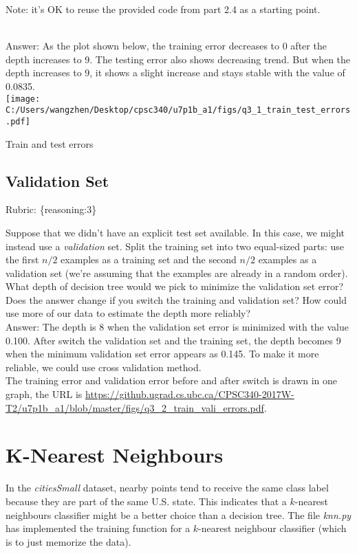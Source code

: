 \documentclass{article}
\def\blu#1{{\color{blu}#1}}
\def\gre#1{{\color{gre}#1}}
\def\rubric#1{\gre{Rubric: \{#1\}}}{}
\begin{document}
Note: it's OK to reuse the provided code from part 2.4 as a starting point.
\textcolor{gre}{
\\Answer:
As the plot shown below, the training error decreases to 0 after the depth increases to 9. The testing error also shows decreasing trend. But when the depth increases to 9, it shows a slight increase and stays stable with the value of 0.0835.\\
\texttt{[image: C:/Users/wangzhen/Desktop/cpsc340/u7p1b\_a1/figs/q3\_1\_train\_test\_errors.pdf]}
\caption{Train and test errors}
}


\subsection{Validation Set}
\rubric{reasoning:3}

Suppose that we didn't have an explicit test set available. In this case, we might instead use a \emph{validation} set. Split the training set into two equal-sized parts: use the first $n/2$ examples as a training set and the second $n/2$ examples as a validation set (we're assuming that the examples are already in a random order). \blu{What depth of decision tree would we pick to minimize the validation set error? Does the answer change if you switch the training and validation set? How could use more of our data to  estimate the depth more reliably?}
\textcolor{gre}{\\
Answer:
The depth is 8 when the validation set error is minimized with the value 0.100. After switch the validation set and the training set, the depth becomes 9 when the minimum validation set error appears as 0.145.
To make it more reliable, we could use cross validation method.\\
The training error and validation error before and after switch is drawn in one graph, the URL is \url{https://github.ugrad.cs.ubc.ca/CPSC340-2017W-T2/u7p1b_a1/blob/master/figs/q3_2_train_vali_errors.pdf}.
}

\section{K-Nearest Neighbours}

In the \emph{citiesSmall} dataset, nearby points tend to receive the same class label because they are part of the same U.S. state. This indicates that a $k$-nearest neighbours classifier might be a better choice than a decision tree. The file \emph{knn.py} has implemented the training function for a $k$-nearest neighbour classifier (which is to just memorize the data).
\end{document}

